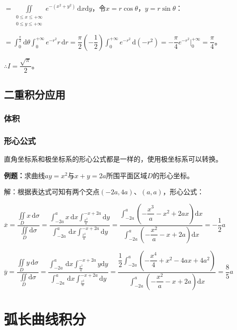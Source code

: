 \documentclass[UTF8, 12pt]{ctexart}
\begin{document}
$=\displaystyle{\iint\limits_{\substack{0\leqslant x\leqslant+\infty\\0\leqslant y\leqslant+\infty}}e^{-(x^2+y^2)}\,\textrm{d}x\textrm{d}y}$，令$x=r\cos\theta$，$y=r\sin\theta$：

$=\displaystyle{\int_0^\frac{\pi}{2}\textrm{d}\theta\int_0^{+\infty}e^{-r^2}r\,\textrm{d}r=\dfrac{\pi}{2}\left(-\dfrac{1}{2}\right)\int_0^{+\infty}e^{-r^2}\,\textrm{d}(-r^2)=-\dfrac{\pi}{4}e^{-r^2}\bigg\vert_0^{+\infty}}=\dfrac{\pi}{4}$。

$\therefore I=\dfrac{\sqrt{\pi}}{2}$。

\subsection{二重积分应用}

\subsubsection{体积}

\subsubsection{形心公式}

直角坐标系和极坐标系的形心公式都是一样的，使用极坐标系可以转换。

\textbf{例题：}求曲线$ay=x^2$与$x+y=2a$所围平面区域$D$的形心坐标。

解：根据表达式可知有两个交点$(-2a,4a)$、$(a,a)$，形心公式：

$\overline{x}=\dfrac{\iint\limits_Dx\,\textrm{d}\sigma}{\iint\limits_D\textrm{d}\sigma}=\dfrac{\int_{-2a}^ax\,\textrm{d}x\int_{\frac{x^2}{a}}^{-x+2a}\textrm{d}y}{\int_{-2a}^a\,\textrm{d}x\int_{\frac{x^2}{a}}^{-x+2a}\textrm{d}y}=\dfrac{\int_{-2a}^a(-\dfrac{x^3}{a}-x^2+2ax)\textrm{d}x}{\int_{-2a}^a(-\dfrac{x^2}{a}-x+2a)\textrm{d}x}=-\dfrac{1}{2}a$

$\overline{y}=\dfrac{\iint\limits_Dy\,\textrm{d}\sigma}{\iint\limits_D\textrm{d}\sigma}=\dfrac{\int_{-2a}^a\,\textrm{d}x\int_{\frac{x^2}{a}}^{-x+2a}y\textrm{d}y}{\int_{-2a}^a\,\textrm{d}x\int_{\frac{x^2}{a}}^{-x+2a}\textrm{d}y}=\dfrac{\dfrac{1}{2}\int_{-2a}^a(-\dfrac{x^4}{4}+x^2-4ax+4a^2)}{\int_{-2a}^a(-\dfrac{x^2}{a}-x+2a)\textrm{d}x}=\dfrac{8}{5}a$

\section{弧长曲线积分}
\end{document}
